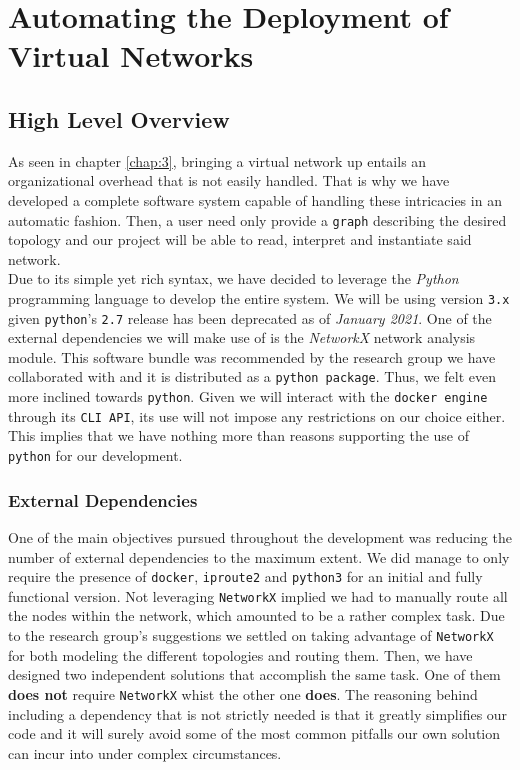 \chapter{Automating the Deployment of Virtual Networks} \label{chap:4}
    \section{High Level Overview}
        As seen in chapter \ref{chap:3}, bringing a virtual network up entails an organizational overhead that is not easily handled. That is why we have developed a complete software system capable of handling these intricacies in an automatic fashion. Then, a user need only provide a \texttt{graph} describing the desired topology and our project will be able to read, interpret and instantiate said network.\\

        Due to its simple yet rich syntax, we have decided to leverage the \textit{Python} \cite{bib:python} programming language to develop the entire system. We will be using version \texttt{3.x} given \texttt{python}'s \texttt{2.7} release has been deprecated as of \textit{January 2021}. One of the external dependencies we will make use of is the \textit{NetworkX} \cite{bib:networkx} network analysis module. This software bundle was recommended by the research group we have collaborated with and it is distributed as a \texttt{python package}. Thus, we felt even more inclined towards \texttt{python}. Given we will interact with the \texttt{docker engine} through its \texttt{CLI API}, its use will not impose any restrictions on our choice either. This implies that we have nothing more than reasons supporting the use of \texttt{python} for our development.\\

        \subsection{External Dependencies}
            One of the main objectives pursued throughout the development was reducing the number of external dependencies to the maximum extent. We did manage to only require the presence of \texttt{docker}, \texttt{iproute2} and \texttt{python3} for an initial and fully functional version. Not leveraging \texttt{NetworkX} implied we had to manually route all the nodes within the network, which amounted to be a rather complex task. Due to the research group's suggestions we settled on taking advantage of \texttt{NetworkX} for both modeling the different topologies and routing them. Then, we have designed two independent solutions that accomplish the same task. One of them \textbf{does not} require \texttt{NetworkX} whist the other one \textbf{does}. The reasoning behind including a dependency that is not strictly needed is that it greatly simplifies our code and it will surely avoid some of the most common pitfalls our own solution can incur into under complex circumstances.\\

